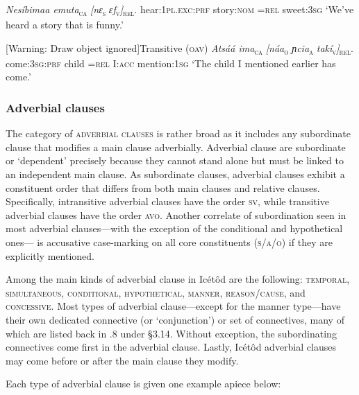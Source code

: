 \textit{Nesíbimaa     emuta}\textsc{\textsubscript{ca}}\textit{   [nɛ}\textsc{\textsubscript{s}}\textit{   ɛf}\textsc{\textsubscript{v}}\textit{]}\textsc{\textsubscript{rel}}.
hear:\textsc{1pl.exc:prf}  story:\textsc{nom}   =\textsc{rel}   sweet:\textsc{3sg}
‘We’ve heard a story that is funny.’


[Warning: Draw object ignored]Transitive (\textsc{oav})
\textit{Atsáá       ima}\textsc{\textsubscript{ca}}\textit{   [náa}\textsc{\textsubscript{o}}\textit{   ɲcia}\textsc{\textsubscript{a}}\textit{   takí}\textsc{\textsubscript{v}}\textit{]}\textsc{\textsubscript{rel}}.
come:\textsc{3sg}:\textsc{prf}   child   =\textsc{rel}   I:\textsc{acc}   mention:\textsc{1sg}
‘The child I mentioned earlier has come.’




\subsubsection{Adverbial clauses}

The category of \textsc{adverbial clauses} is rather broad as it includes any subordinate clause that modifies a main clause adverbially. Adverbial clause are subordinate or ‘dependent’ precisely because they cannot stand alone but must be linked to an independent main clause. As subordinate clauses, adverbial clauses exhibit a constituent order that differs from both main clauses and relative clauses. Specifically, intransitive adverbial clauses have the order \textsc{sv}, while transitive adverbial clauses have the order \textsc{avo}. Another correlate of subordination seen in most adverbial clauses—with the exception of the conditional and hypothetical ones— is accusative case-marking on all core constituents (\textsc{s/a/o}) if they are explicitly mentioned. 

Among the main kinds of adverbial clause in Icétôd are the following: \textsc{temporal}, \textsc{simultaneous}, \textsc{conditional}, \textsc{hypothetical}, \textsc{manner}, \textsc{reason}/\textsc{cause}, and \textsc{concessive}. Most types of adverbial clause—except for the manner type—have their own dedicated connective (or ‘conjunction’) or set of connectives, many of which are listed back in .8 under §3.14. Without exception, the subordinating connectives come first in the adverbial clause. Lastly, Icétôd adverbial clauses may come before or after the main clause they modify. 

Each type of adverbial clause is given one example apiece below:




